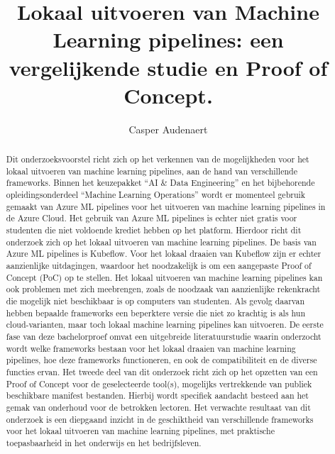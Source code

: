 \documentclass{hogent-article}
\title{Lokaal uitvoeren van Machine Learning pipelines: een vergelijkende studie en Proof of Concept.}
\author{Casper Audenaert}
\begin{document}
\begin{abstract}
  Dit onderzoeksvoorstel richt zich op het verkennen van de mogelijkheden voor het lokaal uitvoeren van machine learning pipelines, aan de hand van verschillende frameworks.
  Binnen het keuzepakket ``AI \& Data Engineering'' en het bijbehorende opleidingsonderdeel ``Machine Learning Operations'' wordt er momenteel gebruik gemaakt van Azure ML pipelines voor het uitvoeren van machine learning pipelines in de Azure Cloud.
  Het gebruik van Azure ML pipelines is echter niet gratis voor studenten die niet voldoende krediet hebben op het platform. Hierdoor richt dit onderzoek zich op het lokaal uitvoeren van machine learning pipelines.
  De basis van Azure ML pipelines is Kubeflow. Voor het lokaal draaien van Kubeflow zijn er echter aanzienlijke uitdagingen, waardoor het noodzakelijk is om een aangepaste Proof of Concept (PoC) op te stellen.
  Het lokaal uitvoeren van machine learning pipelines kan ook problemen met zich meebrengen, zoals de noodzaak van aanzienlijke rekenkracht die mogelijk niet beschikbaar is op computers van studenten. Als gevolg daarvan hebben bepaalde frameworks een beperktere versie die niet zo krachtig is als hun cloud-varianten, maar toch lokaal machine learning pipelines kan uitvoeren.
  De eerste fase van deze bachelorproef omvat een uitgebreide literatuurstudie waarin onderzocht wordt welke frameworks bestaan voor het lokaal draaien van machine learning pipelines, hoe deze frameworks functioneren, en ook de compatibiliteit en de diverse functies ervan.
  Het tweede deel van dit onderzoek richt zich op het opzetten van een Proof of Concept voor de geselecteerde tool(s), mogelijks vertrekkende van publiek beschikbare manifest bestanden. Hierbij wordt specifiek aandacht besteed aan het gemak van onderhoud voor de betrokken lectoren.
  Het verwachte resultaat van dit onderzoek is een diepgaand inzicht in de geschiktheid van verschillende frameworks voor het lokaal uitvoeren van machine learning pipelines, met praktische toepasbaarheid in het onderwijs en het bedrijfsleven.
\end{abstract}

\tableofcontents



\printbibliography[heading=bibintoc]
\end{document}
